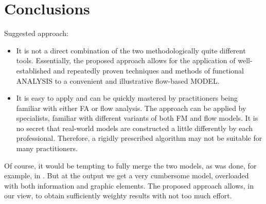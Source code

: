 \documentclass[a4paper,11pt]{article}
\begin{document}
\section*{Conclusions}
Suggested approach:
\begin{itemize}
\item It is not a direct combination of the two methodologically quite
  different tools. Essentially, the proposed approach allows for the
  application of well-established and repeatedly proven techniques and methods
  of functional ANALYSIS to a convenient and illustrative flow-based MODEL.
\item It is easy to apply and can be quickly mastered by practitioners being
  familiar with either FA or flow analysis. The approach can be applied by
  specialists, familiar with different variants of both FM and flow models. It
  is no secret that real-world models are constructed a little differently by
  each professional.  Therefore, a rigidly prescribed algorithm may not be
  suitable for many practitioners.
\end{itemize}
Of course, it would be tempting to fully merge the two models, as was done,
for example, in \cite{1}. But at the output we get a very cumbersome model,
overloaded with both information and graphic elements. The proposed approach
allows, in our view, to obtain sufficiently weighty results with not too much
effort.
\end{document}

